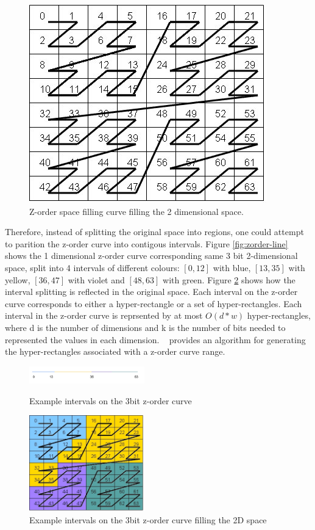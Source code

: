 \documentclass[11pt,a4paper]{globis-book}
\begin{document}
\begin{figure}
    \centering
    \includegraphics[scale=0.8]{images/zordering-clear}
    \caption{Z-order space filling curve filling the 2 dimensional space.}
    \label{fig:zordering-clear}
\end{figure}

Therefore, instead of splitting the original space into regions, one could attempt to parition the z-order curve into contigous intervals. Figure \ref{fig:zorder-line} shows the 1 dimensional z-order curve corresponding same 3 bit 2-dimensional space, split into 4 intervals of different colours: $[{0, 12}]$ with blue, $[13, 35]$ with yellow, $[36, 47]$ with violet and $[48, 63]$ with green. Figure \ref{fig:zorder-square} shows how the interval splitting is reflected in the original space. Each interval on the z-order curve corresponds to either a hyper-rectangle or a set of hyper-rectangles. Each interval in the z-order curve is reprsented by at most $O(d*w)$ hyper-rectangles, where d is the number of dimensions and k is the number of bits needed to represented the values in each dimension. ~\cite{skopal2006-ubtree} provides an algorithm for generating the hyper-rectangles associated with a z-order curve range.

\begin{figure}
    \centering
\parbox{5cm}{
    \includegraphics[width=5cm]{images/zorder-line}
    \caption{Example intervals on the 3bit z-order curve}
    \label{fig:zorder-line}}
\qquad
\begin{minipage}{5cm}
    \includegraphics[width=5cm]{images/zorder-square}
    \caption{Example intervals on the 3bit z-order curve filling the 2D space}
    \label{fig:zorder-square}
\end{minipage}
\end{figure}
\end{document}
